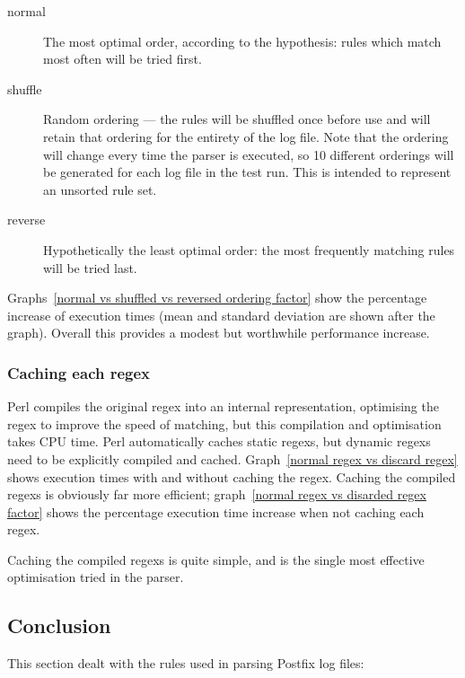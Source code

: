 \documentclass[a4paper,12pt,draft]{article}
\begin{document}
\begin{description}

    \item [normal]  The most optimal order, according to the hypothesis:
        rules which match most often will be tried first.

    \item [shuffle] Random ordering --- the rules will be shuffled once
        before use and will retain that ordering for the entirety of the
        log file.  Note that the ordering will change every time the parser
        is executed, so 10 different orderings will be generated for each
        log file in the test run.  This is intended to represent an
        unsorted rule set.

    \item [reverse] Hypothetically the least optimal order: the most
        frequently matching rules will be tried last.

\end{description}

Graphs~\ref{normal vs shuffled vs reversed ordering factor} show the
percentage increase of execution times (mean and standard deviation are
shown after the graph).  Overall this provides a modest but worthwhile
performance increase.

\subsubsection{Caching each regex}

Perl compiles the original regex into an internal representation,
optimising the regex to improve the speed of matching, but this compilation
and optimisation takes CPU time.  Perl automatically caches static regexs,
but dynamic regexs need to be explicitly compiled and cached.
Graph~\ref{normal regex vs discard regex} shows execution times with and
without caching the regex.  Caching the compiled regexs is obviously far
more efficient; graph~\ref{normal regex vs disarded regex factor} shows the
percentage execution time increase when not caching each regex.

Caching the compiled regexs is quite simple, and is the single most
effective optimisation tried in the parser.

\subsection{Conclusion}

This section dealt with the rules used in parsing Postfix log files:
\end{document}
